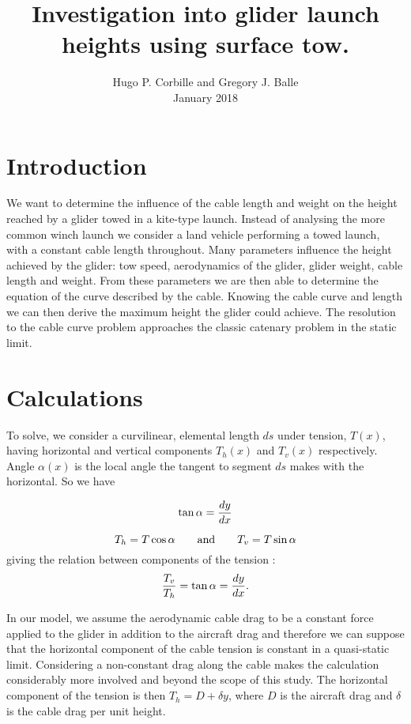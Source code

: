\documentclass[11pt]{amsart}
\title{Investigation into glider launch heights using surface tow.}
\author{
    Hugo P. Corbille and Gregory J. Balle\\
     January 2018
}
\begin{document}

\maketitle


\section{Introduction}
We want to determine the influence of the cable length and weight on the height reached by a glider towed in a kite-type launch. Instead of analysing the more common winch launch we consider a land vehicle performing a towed launch, with a constant cable length throughout. Many parameters influence the height achieved by the glider: tow speed, aerodynamics of the glider, glider weight, cable length and weight. From these parameters we are then able to determine the equation of the curve described by the cable. Knowing the cable curve and length we can then derive the maximum height the glider could achieve. The resolution to the cable curve problem approaches the classic catenary problem in the static limit.

\section{Calculations}
To solve, we consider a curvilinear, elemental length $ds$ under tension, $T(x)$, having horizontal and vertical components $T_{h}(x)$ and $T_{v}(x)$ respectively. Angle $\alpha(x)$ is the local angle the tangent to segment $ds$ makes with the horizontal. So we have 

\begin{equation}
	\centering
	\tan{\alpha} = \frac{dy}{dx}
	\label{eq:deriv}
\end{equation}

\begin{equation}
	\centering
	T_h = T \cos{\alpha} \qquad \text{and} \qquad T_v = T \sin{\alpha}
	\label{eq:Th}
\end{equation}
giving the relation between components of the tension :
\begin{equation}
	\centering
	\frac{T_v}{T_h} = \tan{\alpha} = \frac{dy}{dx}.
	\label{eq:tension}
\end{equation}

In our model, we assume the aerodynamic cable drag to be a constant force applied to the glider in addition to the aircraft drag and therefore we can suppose that the horizontal component of the cable tension is constant in a quasi-static limit. Considering a non-constant drag along the cable makes the calculation considerably more involved and beyond the scope of this study. The horizontal component of the tension is then $T_h = D + \delta y$, where $D$ is the aircraft drag and $\delta$ is the cable drag per unit height. 
\end{document}

